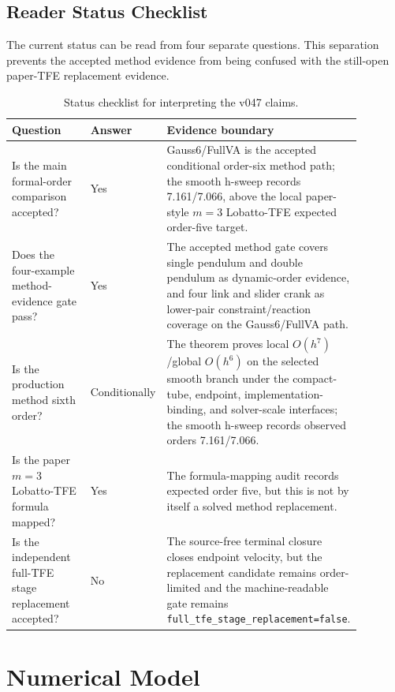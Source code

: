 \documentclass[11pt]{article}
\newcommand{\method}{Gauss6/FullVA}
\newcommand{\tfe}{TFE}
\begin{document}
\subsection{Reader Status Checklist}

The current status can be read from four separate questions.  This separation
prevents the accepted method evidence from being confused with the still-open
paper-\tfe{} replacement evidence.

\begin{table}[t]
\centering
\caption{Status checklist for interpreting the v047 claims.}
\label{tab:reader-status}
\begin{tabular}{P{0.31\linewidth}P{0.17\linewidth}P{0.40\linewidth}}
\toprule
Question & Answer & Evidence boundary \\
\midrule
Is the main formal-order comparison accepted? &
Yes &
\method{} is the accepted conditional order-six method path; the smooth
h-sweep records 7.161/7.066, above the local paper-style $m=3$
Lobatto-\tfe{} expected order-five target. \\
Does the four-example method-evidence gate pass? &
Yes &
The accepted method gate covers single pendulum and double pendulum as
dynamic-order evidence, and four link and slider crank as lower-pair
constraint/reaction coverage on the \method{} path. \\
Is the production method sixth order? &
Conditionally &
The theorem proves local \(O(h^7)\)/global \(O(h^6)\) on the selected smooth
branch under the compact-tube, endpoint, implementation-binding, and
solver-scale interfaces; the smooth h-sweep records observed orders
7.161/7.066. \\
Is the paper $m=3$ Lobatto-\tfe{} formula mapped? &
Yes &
The formula-mapping audit records expected order five, but this is not by
itself a solved method replacement. \\
Is the independent full-\tfe{} stage replacement accepted? &
No &
The source-free terminal closure closes endpoint velocity, but the replacement
candidate remains order-limited and the machine-readable gate remains
\nolinkurl{full_tfe_stage_replacement=false}. \\
\bottomrule
\end{tabular}
\end{table}

\section{Numerical Model}
\end{document}
